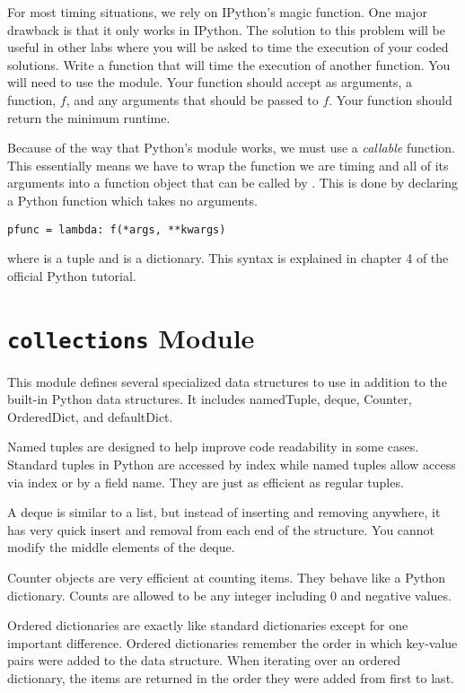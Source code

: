 \begin{problem}
For most timing situations, we rely on IPython's  magic function.
One major drawback is that it only works in IPython.
The solution to this problem will be useful in other labs where you will be asked to time the execution of your coded solutions.
Write a function that will time the execution of another function.
You will need to use the  module.
Your function should accept as arguments, a function, $f$, and any arguments that should be passed to $f$.
Your function should return the minimum runtime.

Because of the way that Python's  module works, we must use a \emph{callable} function.
This essentially means we have to wrap the function we are timing and all of its arguments into a function object that can be called by .
This is done by declaring a Python  function which takes no arguments.
\begin{lstlisting}
pfunc = lambda: f(*args, **kwargs)
\end{lstlisting}
where  is a tuple and  is a dictionary.
This syntax is explained in chapter 4 of the official Python tutorial.
\end{problem}

\section*{\texttt{collections} Module}
This module defines several specialized data structures to use in addition to the built-in Python data structures. It includes namedTuple, deque, Counter, OrderedDict, and defaultDict.

Named tuples are designed to help improve code readability in some cases.
Standard tuples in Python are accessed by index while named tuples allow access via index or by a field name.  They are just as efficient as regular tuples.

A deque is similar to a list, but instead of inserting and removing anywhere, it has very quick insert and removal from each end of the structure.  You cannot modify the middle elements of the deque.
 
Counter objects are very efficient at counting items.  They behave like a Python dictionary.  Counts are allowed to be any integer including 0 and negative values.
 
Ordered dictionaries are exactly like standard dictionaries except for one important difference.
Ordered dictionaries remember the order in which key-value pairs were added to the data structure.
When iterating over an ordered dictionary, the items are returned in the order they were added from first to last.

